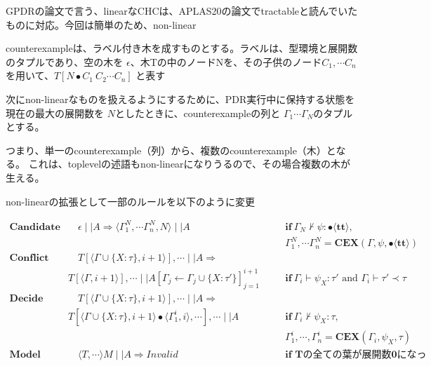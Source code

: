 \documentclass[runningheads]{llncs}
\newcommand\COL{\mathbin{:}}
\newcommand \true {\textbf{tt}}
\newcommand \stypebool {\bullet}
\newcommand \typebool[1]{\stypebool \langle #1 \rangle}
\begin{document}
GPDRの論文で言う、linearなCHCは、APLAS20の論文でtractableと読んでいたものに対応。今回は簡単のため、non-linear

counterexampleは、ラベル付き木を成すものとする。ラベルは、型環境と展開数のタプルであり、空の木を \( \epsilon \)、木Tの中のノードNを、その子供のノード\( C_1, \cdots C_n \) を用いて、\( T[N \bullet C_1\ C_2\cdots C_n] \) と表す


次にnon-linearなものを扱えるようにするために、PDR実行中に保持する状態を
現在の最大の展開数を \( N \)としたときに、counterexampleの列と
\( \Gamma_1 \cdots \Gamma_N \)のタプルとする。

つまり、単一のcounterexample（列）から、複数のcounterexample（木）となる。
これは、toplevelの述語もnon-linearになりうるので、その場合複数の木が生える。

non-linearの拡張として一部のルールを以下のように変更

\begin{align*}
    \textbf{Candidate} &\quad
        \epsilon \mid \mid A
        \Longrightarrow
        \langle \Gamma_1^N, \cdots \Gamma_n^N, N \rangle \mid \mid A
        && \quad \textbf{if} \ \Gamma_N \not \vdash \psi \COL
        \typebool{\true},\\
        &&&\quad \Gamma_1^N, \cdots \Gamma_n^N = \textbf{CEX}(\Gamma, \psi, \typebool{\true})
        \\
    \textbf{Conflict} &\quad
        T[\langle \Gamma \cup \{X: \tau\}, i + 1 \rangle], \cdots \mid \mid A
        \Longrightarrow&&\\
        & T[\langle \Gamma, i + 1 \rangle], \cdots
        \mid \mid A[\Gamma_j \leftarrow \Gamma_j \cup \{X: \tau'\}]_{j=1}^{i+1}
        &&\quad \textbf{if} \  \Gamma_i \vdash \psi_X \COL \tau' \text{ and }
        \Gamma_i \vdash \tau' \prec \tau
        \\
    \textbf{Decide} &\quad
         T[\langle\Gamma \cup \{X: \tau\}, i + 1 \rangle],  \cdots\mid \mid A
        \Longrightarrow&&\\
        &  T[\langle\Gamma \cup \{X: \tau\}, i + 1 \rangle \bullet \langle\Gamma_1^i, i\rangle, \cdots], \cdots
        \mid \mid A
        &&\quad \textbf{if} \ \Gamma_i \not\vdash \psi_X \COL \tau,\\
        &&&\quad \Gamma_1^i, \cdots, \Gamma_n^i = \textbf{CEX}(\Gamma_i, \psi_X, \tau)
        \\
    \textbf{Model} &\quad
        \langle T, \cdots \rangle M \mid \mid A \Rightarrow Invalid
        &&\quad \textbf{if Tの全ての葉が展開数0になったとき} \
        \\
\end{align*}
\end{document}
